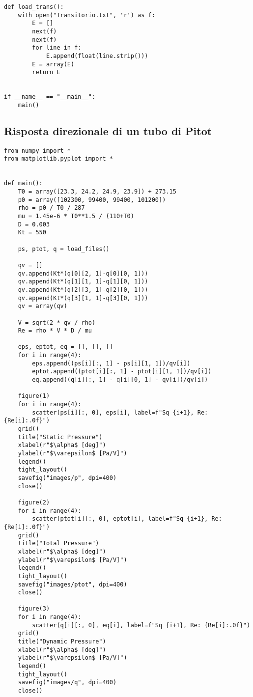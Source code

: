 \begin{lstlisting}
def load_trans():
    with open("Transitorio.txt", 'r') as f:
        E = []
        next(f)
        next(f)
        for line in f:
            E.append(float(line.strip()))
        E = array(E)
        return E
    

if __name__ == "__main__":
    main()
\end{lstlisting}

\subsection{Risposta direzionale di un tubo di Pitot}\label{b2}
\begin{lstlisting}
from numpy import *
from matplotlib.pyplot import *


def main():
    T0 = array([23.3, 24.2, 24.9, 23.9]) + 273.15
    p0 = array([102300, 99400, 99400, 101200])
    rho = p0 / T0 / 287
    mu = 1.45e-6 * T0**1.5 / (110+T0)
    D = 0.003
    Kt = 550

    ps, ptot, q = load_files()

    qv = []
    qv.append(Kt*(q[0][2, 1]-q[0][0, 1]))
    qv.append(Kt*(q[1][1, 1]-q[1][0, 1]))
    qv.append(Kt*(q[2][3, 1]-q[2][0, 1]))
    qv.append(Kt*(q[3][1, 1]-q[3][0, 1]))
    qv = array(qv)

    V = sqrt(2 * qv / rho)
    Re = rho * V * D / mu

    eps, eptot, eq = [], [], []
    for i in range(4):
        eps.append((ps[i][:, 1] - ps[i][1, 1])/qv[i])
        eptot.append((ptot[i][:, 1] - ptot[i][1, 1])/qv[i])
        eq.append((q[i][:, 1] - q[i][0, 1] - qv[i])/qv[i])

    figure(1)
    for i in range(4):
        scatter(ps[i][:, 0], eps[i], label=f"Sq {i+1}, Re: {Re[i]:.0f}")
    grid()
    title("Static Pressure")
    xlabel(r"$\alpha$ [deg]")
    ylabel(r"$\varepsilon$ [Pa/V]")
    legend()
    tight_layout()
    savefig("images/p", dpi=400)
    close()

    figure(2)
    for i in range(4):
        scatter(ptot[i][:, 0], eptot[i], label=f"Sq {i+1}, Re: {Re[i]:.0f}")
    grid()
    title("Total Pressure")
    xlabel(r"$\alpha$ [deg]")
    ylabel(r"$\varepsilon$ [Pa/V]")
    legend()
    tight_layout()
    savefig("images/ptot", dpi=400)
    close()

    figure(3)
    for i in range(4):
        scatter(q[i][:, 0], eq[i], label=f"Sq {i+1}, Re: {Re[i]:.0f}")
    grid()
    title("Dynamic Pressure")
    xlabel(r"$\alpha$ [deg]")
    ylabel(r"$\varepsilon$ [Pa/V]")
    legend()
    tight_layout()
    savefig("images/q", dpi=400)
    close()


\end{lstlisting}
